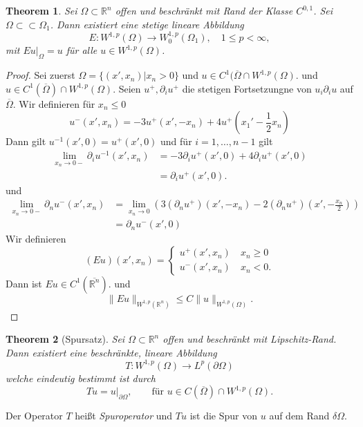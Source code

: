 \documentclass[
paper=a4,
bibtotocnumbered,
liststotocnumbered,
tablecaptionabove,
pointlessnumbers,
twoside,
openright,
10pt
]
{report}
\newtheorem{thm}{Theorem}[chapter]
\theoremstyle{definition}
\numberwithin{equation}{chapter}
\begin{document}
\begin{thm}\label{4.6}
 Sei $\Omega\subset \mathbb R^n$ offen und beschränkt mit Rand der Klasse $C^{0,1}$. Sei $\Omega \subset \subset \Omega_1$. Dann existiert eine stetige lineare Abbildung
 \begin{equation}
 E: W^{1,p}(\Omega) \to W_{0}^{1,p}(\Omega_1), \quad 1\le p <\infty,
 \end{equation}
 mit $Eu\big|_\Omega=u$ für alle $u\in W^{1,p}(\Omega)$. 
\end{thm}
\begin{proof}
 Sei zuerst $\Omega=\{(x', x_n) |x_n >0\}$ und $u\in C^1(\overline{\Omega} \cap W^{1,p}(\Omega)$. und $u\in C^1(\overline{\Omega}) \cap W^{1,p}(\Omega)$. Seien $u^+, \partial_i u^+$ die stetigen Fortsetzungne von $u_i \partial_i u$ auf $\overline{\Omega}$. Wir definieren für $x_n \le 0$
 \begin{equation}
  u^{-}(x', x_n) = - 3 u^+(x', -x_n) + 4u^+\left (x_1' - \frac{1}{2} x_n\right )
 \end{equation}
 Dann gilt $u^{-1}(x',0)=u^+(x',0)$ und für
 $i=1, \ldots, n-1$ gilt
 \begin{align*}
  \lim_{x_n\to 0-} \partial_i  u^{-1}(x', x_n) &= - 3\partial_i u^{+}(x',0) + 4\partial_i u^+(x',0) \\
  &=\partial_i u^+ (x',0).
 \end{align*}
und 
\begin{align*}
 \lim_{x_n\to 0-} \partial_n u^{-} (x', x_n) &= \lim_{x_n\to 0} (3(\partial_n u^+) (x', -x_n) - 2(\partial_n u^+) (x', -\frac{x_n}{2}))\\
 &=\partial_n u^{-}(x',0)
\end{align*}
Wir definieren
\begin{equation}
 (Eu)(x', x_n) = \begin{cases}
                  u^{+}(x', x_n) \quad x_n \ge 0 \\
                  u^{-}(x', x_n) \quad x_n <0.
                 \end{cases}
\end{equation}
Dann ist $Eu\in C^1(\overline{\mathbb R^n})$. und 
\begin{equation}
 \| Eu\|_{W^{1,p}(\mathbb R^n)} \le C\|u\|_{W^{1,p}(\Omega)}.
\end{equation}
\end{proof}
\begin{thm}[Spursatz] \label{4.7}
Sei $\Omega \subset \mathbb R^n$ offen und beschränkt mit Lipschitz-Rand. Dann existiert eine beschränkte, lineare Abbildung
\begin{equation}
T: W^{1,p}(\Omega) \to L^p(\partial \Omega)
\end{equation}
welche eindeutig bestimmt ist durch
\begin{equation}
Tu = u\big|_{\partial \Omega}, \qquad \text{für } u\in C(\overline{\Omega}) \cap W^{1,p}(\Omega).
\end{equation}
\end{thm}
Der Operator $T$ heißt \emph{Spuroperator} und $Tu$ ist die Spur von $u$ auf dem Rand $\delta \Omega$.
\end{document}
